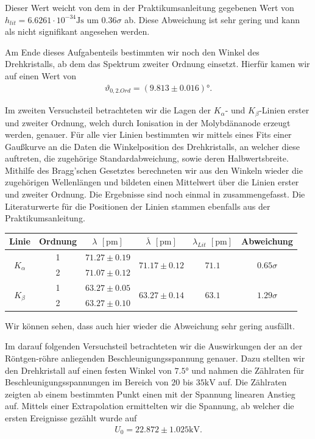 Dieser Wert weicht von dem in der Praktikumsanleitung gegebenen Wert von $h_{lit} = 6.6261 \cdot 10^{-34} \si{\joule\second}$ um $0.36\sigma$ ab. Diese Abweichung ist sehr gering und kann als nicht signifikant angesehen werden.

Am Ende dieses Aufgabenteils bestimmten wir noch den Winkel des Drehkristalls, ab dem das Spektrum zweiter Ordnung einsetzt. Hierfür kamen wir auf einen Wert von
\begin{align}
  \vartheta_{0,2. Ord} = (9.813 \pm 0.016)\si{\degree}.
\end{align}

Im zweiten Versuchsteil betrachteten wir die Lagen der $K_{\alpha}$- und $K_{\beta}$-Linien erster und zweiter Ordnung, welch durch Ionisation in der Molybdänanode erzeugt werden, genauer. Für alle vier Linien bestimmten wir mittels eines Fits einer Gaußkurve an die Daten die Winkelposition des Drehkristalls, an welcher diese auftreten, die zugehörige Standardabweichung, sowie deren Halbwertsbreite. Mithilfe des Bragg'schen Gesetztes berechneten wir aus den Winkeln wieder die zugehörigen Wellenlängen und bildeten einen Mittelwert über die Linien erster und zweiter Ordnung. Die Ergebnisse sind noch einmal in  zusammengefasst. Die Literaturwerte für die Positionen der Linien stammen ebenfalls aus der Praktikumsanleitung.

\begin{table}[H]
  \centering
  \begin{tabular}{c|c|c|c|c|c}
    Linie & Ordnung & $\lambda$ $[\si{\pico\meter}]$ & $\overline{\lambda}$ $[\si{\pico\meter}]$ & $\lambda_{Lit}$ $[\si{\pico\meter}]$ & Abweichung\\\hline
    \multirow{2}{*}{$K_\alpha$} & 1 & $71.27 \pm 0.19$ & \multirow{2}{*}{$71.17 \pm 0.12$} & \multirow{2}{*}{$71.1$} & \multirow{2}{*}{$0.65\sigma$}\\
     & 2 & $71.07 \pm 0.12$ & & & \\\hline
    \multirow{2}{*}{$K_\beta$} & 1 & $63.27 \pm 0.05$ & \multirow{2}{*}{$63.27 \pm 0.14$} & \multirow{2}{*}{$63.1$} & \multirow{2}{*}{$1.29\sigma$}\\
     & 2 & $63.27 \pm 0.10$ & & & 
  \end{tabular}
  \label{tab:k_linien_zsmf}
\end{table}

Wir können sehen, dass auch hier wieder die Abweichung sehr gering ausfällt.

Im darauf folgenden Versuchsteil betrachteten wir die Auswirkungen der an der Röntgen-röhre anliegenden Beschleunigungsspannung genauer. Dazu stellten wir den Drehkristall auf einen festen Winkel von $7.5\si{\degree}$ und nahmen die Zählraten für Beschleunigungsspannungen im Bereich von $20$ bis $35 \si{\kilo\volt}$ auf. Die Zählraten zeigten ab einem bestimmten Punkt einen mit der Spannung linearen Anstieg auf. Mittels einer Extrapolation ermittelten wir die Spannung, ab welcher die ersten Ereignisse gezählt wurde auf
\begin{align}
  U_{0} = 22.872 \pm 1.025 \si{\kilo\volt}.
\end{align}

